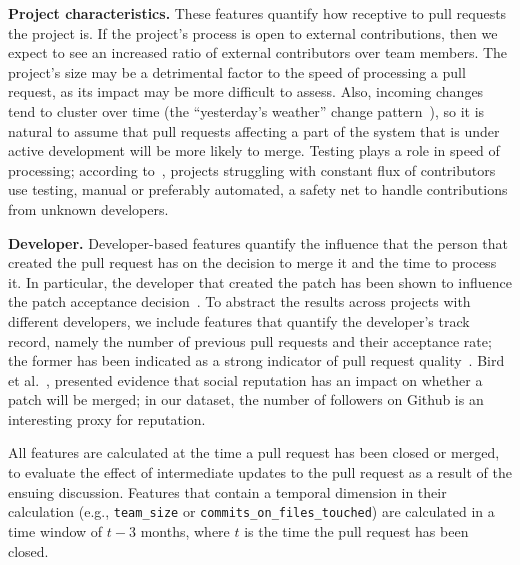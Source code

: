 \documentclass{sig-alternate}
\begin{document}
  \textbf{Project characteristics.} These features quantify how receptive to pull
  requests the project is.  If the project's process is open to external
  contributions, then we expect to see an increased ratio of external
  contributors over team members. The project's size may be a detrimental factor
  to the speed of processing a pull request, as its impact may be more difficult
  to assess. Also, incoming changes tend to cluster over time (the
  ``yesterday's weather'' change pattern~\cite{Girba04}), so it is natural to
  assume that pull requests affecting a part of the system that is under active
  development will be more likely to merge.  Testing plays a role in speed of
  processing; according to~\cite{Pham13}, projects struggling with constant flux
  of contributors use testing, manual or preferably automated, a safety net to
  handle contributions from unknown developers.

  \textbf{Developer.}  
    Developer-based features quantify the influence that the person that
    created the pull request has on the decision to merge it and
    the time to process it. In particular, the developer that created the patch
    has been shown to influence the patch acceptance decision~\cite{Jeong09}. To
    abstract the results across projects with different developers, we
    include features that quantify the developer's track record, namely the
    number of previous pull requests and their acceptance rate; the former has
    been indicated as a strong indicator of pull request quality~\cite{Pham13}.
    Bird et al.~\cite{Bird07}, presented evidence that social
    reputation has an impact on whether a patch will be merged; in our dataset,
    the number of followers on Github is an interesting proxy for
    reputation.

All features are calculated at the time a pull request has been closed or
merged, to evaluate the effect of intermediate updates to the pull request as a
result of the ensuing discussion. Features that contain a temporal dimension in
their calculation (e.g., \texttt{team\_size} or
\texttt{commits\_on\_files\_touched}) are calculated in a time window of $t - 3$
months, where $t$ is the time the pull request has been closed. 
\end{document}
